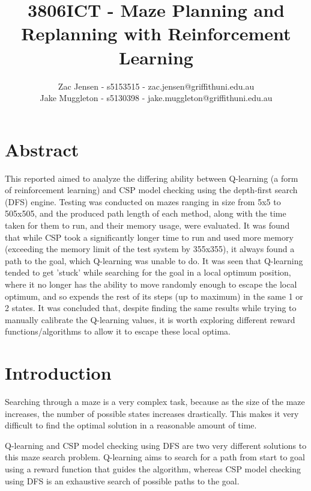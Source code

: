 \documentclass{article}
\title{3806ICT - Maze Planning and Replanning with Reinforcement Learning}
\author{Zac Jensen - s5153515 - zac.jensen@griffithuni.edu.au \\
    Jake Muggleton - s5130398 - jake.muggleton@griffithuni.edu.au}
\newcommand\tab[1][1cm]{\hspace*{#1}}
\begin{document}
    \maketitle


    \section{Abstract}\label{sec:abstract}
        This reported aimed to analyze the differing ability between Q-learning 
        (a form of reinforcement learning) and CSP model checking using the 
        depth-first search (DFS) engine. Testing was conducted on mazes 
        ranging in size from 5x5 to 505x505, and the produced path length of 
        each method, along with the time taken for them to run, and their 
        memory usage, were evaluated. It was found that while CSP took a 
        significantly longer time to run and used more memory (exceeding the
        memory limit of the test system by 355x355), it always found a path
        to the goal, which Q-learning was unable to do. It was seen that 
        Q-learning tended to get 'stuck' while searching for the goal in a
        local optimum position, where it no longer has the ability to move 
        randomly enough to escape the local optimum, and so expends the rest 
        of its steps (up to maximum) in the same 1 or 2 states. It was concluded
        that, despite finding the same results while trying to manually 
        calibrate the Q-learning values, it is worth exploring different
        reward functions/algorithms to allow it to escape these local optima.

    \section{Introduction}\label{sec:introduction}
        Searching through a maze is a very complex task, because as the size 
        of the maze increases, the number of possible states increases 
        drastically. This makes it very difficult to find the 
        optimal solution in a reasonable amount of time.

        \tab Q-learning and CSP model checking using DFS are two very different 
        solutions to this maze search problem. Q-learning aims to search 
        for a path from start to goal using a reward function that guides 
        the algorithm, whereas CSP model checking using DFS is an exhaustive 
        search of possible paths to the goal.
\end{document}
